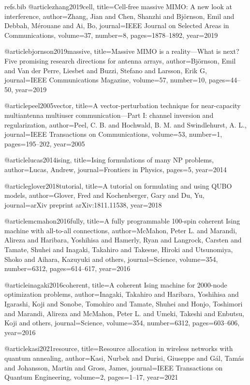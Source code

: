 \begin{filecontents*}{refs.bib}
@article{zhang2019cell,
  title={Cell-free massive MIMO: A new look at interference},
  author={Zhang, Jian and Chen, Shanzhi and Bj{\"o}rnson, Emil and Debbah, M{\'e}rouane and Ai, Bo},
  journal={IEEE Journal on Selected Areas in Communications},
  volume={37},
  number={8},
  pages={1878--1892},
  year={2019}
}

@article{bjornson2019massive,
  title={Massive MIMO is a reality—What is next? Five promising research directions for antenna arrays},
  author={Bj{\"o}rnson, Emil and Van der Perre, Liesbet and Buzzi, Stefano and Larsson, Erik G},
  journal={IEEE Communications Magazine},
  volume={57},
  number={10},
  pages={44--50},
  year={2019}
}

@article{peel2005vector,
  title={A vector-perturbation technique for near-capacity multiantenna multiuser communication—Part I: channel inversion and regularization},
  author={Peel, C. B. and Hochwald, B. M. and Swindlehurst, A. L.},
  journal={IEEE Transactions on Communications},
  volume={53},
  number={1},
  pages={195--202},
  year={2005}
}

@article{lucas2014ising,
  title={Ising formulations of many NP problems},
  author={Lucas, Andrew},
  journal={Frontiers in Physics},
  pages={5},
  year={2014}
}

@article{glover2018tutorial,
  title={A tutorial on formulating and using QUBO models},
  author={Glover, Fred and Kochenberger, Gary and Du, Yu},
  journal={arXiv preprint arXiv:1811.11538},
  year={2018}
}

@article{mcmahon2016fully,
  title={A fully programmable 100-spin coherent Ising machine with all-to-all connections},
  author={McMahon, Peter L. and Marandi, Alireza and Haribara, Yoshihisa and Hamerly, Ryan and Langrock, Carsten and Tamate, Shuhei and Inagaki, Takahiro and Takesue, Hiroki and Utsunomiya, Shoko and Aihara, Kazuyuki and others},
  journal={Science},
  volume={354},
  number={6312},
  pages={614--617},
  year={2016}
}

@article{inagaki2016coherent,
  title={A coherent Ising machine for 2000-node optimization problems},
  author={Inagaki, Takahiro and Haribara, Yoshihisa and Igarashi, Koji and Sonobe, Tomohiro and Tamate, Shuhei and Honjo, Toshimori and Marandi, Alireza and McMahon, Peter L. and Umeki, Takeshi and Enbutsu, Koji and others},
  journal={Science},
  volume={354},
  number={6312},
  pages={603--606},
  year={2016}
}

@article{kasi2021resource,
  title={Resource allocation in wireless networks with quantum annealing},
  author={Kasi, Nurbek and Durisi, Giuseppe and G{\'a}l, Tam{\'a}s and Johansson, Martin and Gross, James},
  journal={IEEE Transactions on Quantum Engineering},
  volume={2},
  pages={1--17},
  year={2021}
}


\end{filecontents*}
